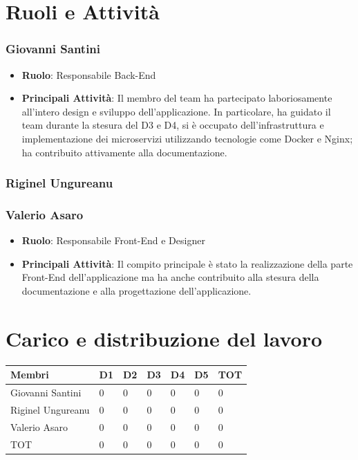 \documentclass{report}
\begin{document}
\section{Ruoli e Attività}

\subsubsection{Giovanni Santini}
\begin{itemize}
	\item \textbf{Ruolo}: Responsabile Back-End
	\item \textbf{Principali Attività}: Il membro del team ha partecipato laboriosamente all'intero design e sviluppo dell'applicazione. In particolare, ha guidato il team durante la stesura del D3 e D4, si è occupato dell'infrastruttura e implementazione dei microservizi utilizzando tecnologie come Docker e Nginx; ha contribuito attivamente alla documentazione.
\end{itemize}

\subsubsection{Riginel Ungureanu}

\subsubsection{Valerio Asaro}
\begin{itemize}
	\item \textbf{Ruolo}: Responsabile Front-End e Designer
	\item \textbf{Principali Attività}: Il compito principale è stato la realizzazione della parte Front-End dell'applicazione ma ha anche contribuito alla stesura della documentazione e alla progettazione dell'applicazione.
\end{itemize}

\section{Carico e distribuzione del lavoro}
\begin{center} %
	\centering
	\begin{tabular}{ |p{3cm}|p{1cm}|p{1cm}|p{1cm}|p{1cm}|p{1cm}|p{1cm}|  }
		\hline
		\centering  Membri  &  D1 &  D2 & D3 & D4 & D5 & TOT\\ %
		\hline
		\centering Giovanni Santini & 0 & 0 & 0 & 0 & 0 & 0 \\
		\hline
		\centering Riginel Ungureanu & 0 & 0 & 0 & 0 & 0 & 0 \\
		\hline
		\centering Valerio Asaro & 0 & 0 & 0 & 0 & 0 & 0 \\
		\hline
		\centering TOT & 0 & 0 & 0 & 0 & 0 & 0 \\
		\hline
	\end{tabular}
\end{center}
\end{document}
